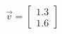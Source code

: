 \documentclass[preview]{standalone}
\begin{document}
\begin{align*}
\vec{v}=\begin{bmatrix}1.3\\1.6\end{bmatrix}
\end{align*}
\end{document}
